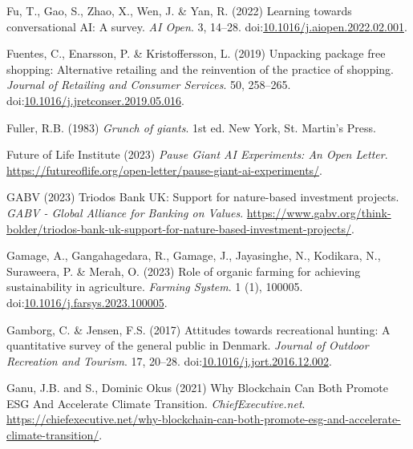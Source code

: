 \documentclass[
  letterpaper,
  DIV=11,
  numbers=noendperiod]{scrartcl}
\newlength{\cslhangindent}
\newenvironment{CSLReferences}[2] %
 {\begin{list}{}{%
  \setlength{\itemindent}{0pt}
  \setlength{\leftmargin}{0pt}
  \setlength{\parsep}{0pt}
  \ifodd #1
   \setlength{\leftmargin}{\cslhangindent}
   \setlength{\itemindent}{-1\cslhangindent}
  \fi
  \setlength{\itemsep}{#2\baselineskip}}}
 {\end{list}}
\begin{document}
\begin{CSLReferences}{0}{1}
Fu, T., Gao, S., Zhao, X., Wen, J. \& Yan, R. (2022) Learning towards
conversational {AI}: {A} survey. \emph{AI Open}. 3, 14--28.
doi:\href{https://doi.org/10.1016/j.aiopen.2022.02.001}{10.1016/j.aiopen.2022.02.001}.

Fuentes, C., Enarsson, P. \& Kristoffersson, L. (2019) Unpacking package
free shopping: {Alternative} retailing and the reinvention of the
practice of shopping. \emph{Journal of Retailing and Consumer Services}.
50, 258--265.
doi:\href{https://doi.org/10.1016/j.jretconser.2019.05.016}{10.1016/j.jretconser.2019.05.016}.

Fuller, R.B. (1983) \emph{Grunch of giants}. 1st ed. New York, St.
Martin's Press.

Future of Life Institute (2023) \emph{Pause {Giant AI Experiments}: {An
Open Letter}}.
\url{https://futureoflife.org/open-letter/pause-giant-ai-experiments/}.

GABV (2023) Triodos {Bank UK}: {Support} for nature-based investment
projects. \emph{GABV - Global Alliance for Banking on Values}.
\url{https://www.gabv.org/think-bolder/triodos-bank-uk-support-for-nature-based-investment-projects/}.

Gamage, A., Gangahagedara, R., Gamage, J., Jayasinghe, N., Kodikara, N.,
Suraweera, P. \& Merah, O. (2023) Role of organic farming for achieving
sustainability in agriculture. \emph{Farming System}. 1 (1), 100005.
doi:\href{https://doi.org/10.1016/j.farsys.2023.100005}{10.1016/j.farsys.2023.100005}.

Gamborg, C. \& Jensen, F.S. (2017) Attitudes towards recreational
hunting: {A} quantitative survey of the general public in {Denmark}.
\emph{Journal of Outdoor Recreation and Tourism}. 17, 20--28.
doi:\href{https://doi.org/10.1016/j.jort.2016.12.002}{10.1016/j.jort.2016.12.002}.

Ganu, J.B. and S., Dominic Okus (2021) Why {Blockchain Can Both Promote
ESG And Accelerate Climate Transition}. \emph{ChiefExecutive.net}.
\url{https://chiefexecutive.net/why-blockchain-can-both-promote-esg-and-accelerate-climate-transition/}.


\end{CSLReferences}
\end{document}
